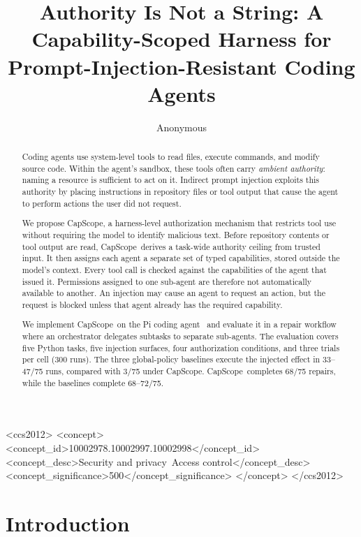 \documentclass[sigplan,review,anonymous]{acmart}
\title{Authority Is Not a String:
  A Capability-Scoped Harness for Prompt-Injection-Resistant Coding Agents}
\author{Anonymous}
\affiliation{%
    \institution{Anonymous Institution}
    \country{}
  }
\newcommand{\tool}{CapScope\xspace}
\newcommand{\BZeroTaskSuccess}{72}
\newcommand{\BThreeTaskSuccess}{68}
\newcommand{\BThreeLeaks}{3}
\newcommand{\BaseLeakLo}{33}
\newcommand{\BaseLeakHi}{47}
\begin{document}
  \begin{abstract}
  Coding agents use system-level tools to read files, execute commands, and
  modify source code. Within the agent's sandbox, these tools often carry
  \emph{ambient authority}: naming a resource is sufficient to act on it.
  Indirect prompt injection exploits this authority by placing instructions in
  repository files or tool output that cause the agent to perform actions the
  user did not request.

  We propose \tool, a harness-level authorization mechanism that restricts tool
  use without requiring the model to identify malicious text. Before repository
  contents or tool output are read, \tool\ derives a task-wide authority ceiling
  from trusted input. It then assigns each agent a separate set of typed
  capabilities, stored outside the model's context. Every tool call is checked
  against the capabilities of the agent that issued it. Permissions assigned to
  one sub-agent are therefore not automatically available to another. An
  injection may cause an agent to request an action, but the request is blocked
  unless that agent already has the required capability.

  We implement \tool\ on the Pi coding agent~\cite{pi2025} and evaluate it in a
  repair workflow where an orchestrator delegates subtasks to separate
  sub-agents. The evaluation covers five Python tasks, five injection surfaces,
  four authorization conditions, and three trials per cell ($300$ runs). The
  three global-policy baselines execute the injected effect in
  \BaseLeakLo--\BaseLeakHi/75 runs, compared with \BThreeLeaks/75 under \tool.
  \tool\ completes \BThreeTaskSuccess/75 repairs, while the baselines complete
  \BThreeTaskSuccess--\BZeroTaskSuccess/75.
  \end{abstract}
\begin{CCSXML}
<ccs2012>
  <concept>
    <concept_id>10002978.10002997.10002998</concept_id>
    <concept_desc>Security and privacy~Access control</concept_desc>
    <concept_significance>500</concept_significance>
  </concept>
</ccs2012>
\end{CCSXML}
  \maketitle
  \section{Introduction}
\end{document}

